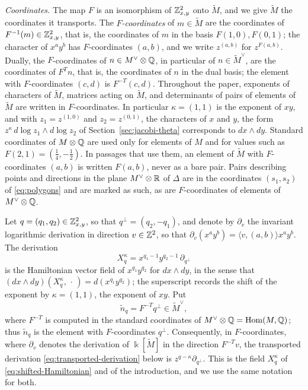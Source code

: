 \emph{Coordinates.}  The map $F$ is an isomorphism of
$\mathbb Z^2_{x,y}$ onto $\widetilde M$, and we give $\widetilde M$ the coordinates
it transports.  The \emph{$F$-coordinates} of $m\in\widetilde M$ are the
coordinates of $F^{-1}(m)\in \mathbb Z^2_{x,y}$, that is, the coordinates of $m$ in
the basis $F(1,0),F(0,1)$; the character of $x^ay^b$ has $F$-coordinates
$(a,b)$, and we write $z^{(a,b)}$ for $z^{F(a,b)}$.  Dually, the
$F$-coordinates of $n\in M^\vee\otimes\mathbb Q$, in particular of
$n\in\widetilde M^\vee$, are the coordinates of $F^Tn$, that is, the
coordinates of $n$ in the dual basis; the element with $F$-coordinates
$(c,d)$ is $F^{-T}(c,d)$.  Throughout the paper, exponents of characters of
$\widetilde M$, matrices acting on $\widetilde M$, and determinants of pairs
of elements of $\widetilde M$ are written in $F$-coordinates.  In particular
$\kappa=(1,1)$ is the exponent of $xy$, and with $z_1=z^{(1,0)}$ and
$z_2=z^{(0,1)}$, the characters of $x$ and $y$, the form
$z^\kappa\,d\log z_1\wedge d\log z_2$ of Section~\ref{sec:jacobi-theta}
corresponds to $dx\wedge dy$.  Standard coordinates of
$M\otimes\mathbb Q$ are used only for elements of $M$
and for values such as $F(2,1)=(\frac14,-\frac12)$.  In passages that use
them, an element of $\widetilde M$ with $F$-coordinates $(a,b)$ is written
$F(a,b)$, never as a bare pair.  Pairs describing points and directions in
the plane $M^\vee\otimes\mathbb R$ of $\Delta$ are in the coordinates $(s_1,s_2)$
of \eqref{eq:polygons} and are marked as such, as are $F$-coordinates of
elements of $M^\vee\otimes\mathbb Q$.

Let $q=(q_1,q_2)\in\mathbb Z^2_{x,y}$, so that $q^\perp=(q_2,-q_1)$, and denote by
$\partial_v$ the invariant logarithmic derivation in direction $v\in\mathbb Z^2$,
so that $\partial_v(x^ay^b)=\langle v,(a,b)\rangle x^ay^b$.  The derivation
\[
 X^\kappa_q=x^{q_1-1}y^{q_2-1}\,\partial_{q^\perp}
\]
is the Hamiltonian vector field of $x^{q_1}y^{q_2}$ for $dx\wedge dy$, in the
sense that $(dx\wedge dy)(X^\kappa_q,\,\cdot\,)=d(x^{q_1}y^{q_2})$; the
superscript records the shift of the exponent by $\kappa=(1,1)$, the
exponent of $xy$.  Put
\begin{equation}\label{eq:normal-q}
 \widetilde n_q=F^{-T}q^\perp\in\widetilde M^\vee,
\end{equation}
where $F^{-T}$ is computed in the standard coordinates of
$M^\vee\otimes\mathbb Q=\operatorname{Hom}(M,\mathbb Q)$; thus
$\widetilde n_q$ is the element with $F$-coordinates $q^\perp$.
Consequently, in $F$-coordinates, where $\partial_v$ denotes the derivation
of $\Bbbk[\widetilde M]$ in the direction $F^{-T}v$, the transported
derivation \eqref{eq:transported-derivation} below is
$z^{q-\kappa}\partial_{q^\perp}$.  This is the field $X^\kappa_q$ of
\eqref{eq:shifted-Hamiltonian} and of the introduction, and we use the same
notation for both.

